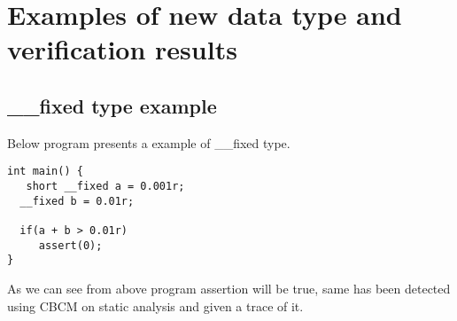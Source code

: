 \appendix
\chapter{Examples of new data type and verification results} \label{appendix:a}

\section{\_\_fixed type example}

Below program presents a example of \_\_fixed type.

\begin{lstlisting}
int main() {
   short __fixed a = 0.001r;
  __fixed b = 0.01r;

  if(a + b > 0.01r)
     assert(0);
}
\end{lstlisting}

As we can see from above program assertion will be true, same has been detected using CBCM on static analysis and given a trace of it.

